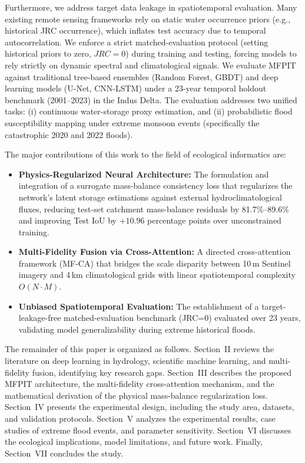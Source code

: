 \documentclass[journal]{IEEEtran}
\begin{document}
Furthermore, we address target data leakage in spatiotemporal evaluation. Many existing remote sensing frameworks rely on static water occurrence priors (e.g., historical JRC occurrence), which inflates test accuracy due to temporal autocorrelation. We enforce a strict matched-evaluation protocol (setting historical priors to zero, $JRC=0$) during training and testing, forcing models to rely strictly on dynamic spectral and climatological signals. We evaluate MFPIT against traditional tree-based ensembles (Random Forest, GBDT) and deep learning models (U-Net, CNN-LSTM) under a 23-year temporal holdout benchmark (2001--2023) in the Indus Delta. The evaluation addresses two unified tasks: (i) continuous water-storage proxy estimation, and (ii) probabilistic flood susceptibility mapping under extreme monsoon events (specifically the catastrophic 2020 and 2022 floods).

The major contributions of this work to the field of ecological informatics are:
\begin{itemize}
    \item \textbf{Physics-Regularized Neural Architecture:} The formulation and integration of a surrogate mass-balance consistency loss that regularizes the network's latent storage estimations against external hydroclimatological fluxes, reducing test-set catchment mass-balance residuals by 81.7\%--89.6\% and improving Test IoU by $+10.96$ percentage points over unconstrained training.
    \item \textbf{Multi-Fidelity Fusion via Cross-Attention:} A directed cross-attention framework (MF-CA) that bridges the scale disparity between 10\,m Sentinel imagery and 4\,km climatological grids with linear spatiotemporal complexity $O(N \cdot M)$.
    \item \textbf{Unbiased Spatiotemporal Evaluation:} The establishment of a target-leakage-free matched-evaluation benchmark (JRC=0) evaluated over 23 years, validating model generalizability during extreme historical floods.
\end{itemize}

The remainder of this paper is organized as follows. Section~II reviews the literature on deep learning in hydrology, scientific machine learning, and multi-fidelity fusion, identifying key research gaps. Section~III describes the proposed MFPIT architecture, the multi-fidelity cross-attention mechanism, and the mathematical derivation of the physical mass-balance regularization loss. Section~IV presents the experimental design, including the study area, datasets, and validation protocols. Section~V analyzes the experimental results, case studies of extreme flood events, and parameter sensitivity. Section~VI discusses the ecological implications, model limitations, and future work. Finally, Section~VII concludes the study.
\end{document}
